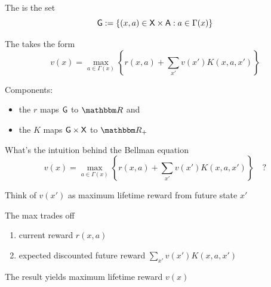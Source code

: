\documentclass[dvipsnames]{beamer}
\begin{document}
\begin{frame}

    The  is the set
    \begin{equation*}
        \mathsf G := \{ (x, a) \in \mathsf X \times \mathsf A : a \in \Gamma(x) \}
    \end{equation*}

    
    The  takes the form
    \begin{equation*}
        v(x)
        = \max_{a \in \Gamma(x)}
        \left\{
            r(x, a)
            + \sum_{x'} v(x') K(x, a, x')
        \right\}
    \end{equation*}

    \medskip
    Components:
    \begin{itemize}
        \item the  $r$ maps $\mathsf G$ to $\RR$ and
            \medskip
        \item the  $K$ maps $\mathsf G \times \mathsf X$ to $\RR_+$ 
    \end{itemize}

\end{frame}

\begin{frame}

    What's the intuition behind the Bellman equation
    \begin{equation*}
        v(x)
        = \max_{a \in \Gamma(x)}
        \left\{
            r(x, a)
            + \sum_{x'} v(x') K(x, a, x')
        \right\} 
        \quad?
    \end{equation*}

    \medskip
    Think of $v(x')$ as maximum lifetime reward from future state $x'$

    The max trades off
    \begin{enumerate}
        \item current reward $r(x, a)$
            \medskip
        \item expected discounted future reward $\sum_{x'} v(x') K(x, a, x')$
    \end{enumerate}

    \medskip
    \medskip

    The result yields maximum lifetime reward $v(x)$

\end{frame}
\end{document}
